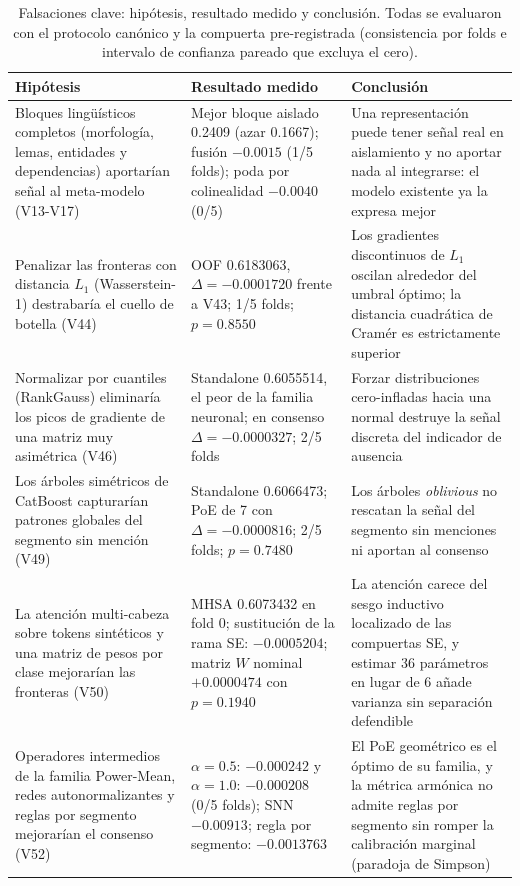 \documentclass[journal]{IEEEtai}
\begin{document}
\begin{table}[htbp]
\centering
\caption{Falsaciones clave: hip\'otesis, resultado medido y conclusi\'on. Todas se evaluaron con el protocolo can\'onico y la compuerta pre-registrada (consistencia por folds e intervalo de confianza pareado que excluya el cero).}
\label{tab:falsaciones}
\begin{tabular}{p{}p{}p{}}
\toprule
Hip\'otesis & Resultado medido & Conclusi\'on \\
\midrule
Bloques ling\"u\'isticos completos (morfolog\'ia, lemas, entidades y dependencias) aportar\'ian se\~nal al meta-modelo (V13-V17) & Mejor bloque aislado 0.2409 (azar 0.1667); fusi\'on $-0.0015$ (1/5 folds); poda por colinealidad $-0.0040$ (0/5) & Una representaci\'on puede tener se\~nal real en aislamiento y no aportar nada al integrarse: el modelo existente ya la expresa mejor \\
Penalizar las fronteras con distancia $L_1$ (Wasserstein-1) destrabar\'ia el cuello de botella (V44) & OOF 0.6183063, $\Delta = -0.0001720$ frente a V43; 1/5 folds; $p = 0.8550$ & Los gradientes discontinuos de $L_1$ oscilan alrededor del umbral \'optimo; la distancia cuadr\'atica de Cram\'er es estrictamente superior \\
Normalizar por cuantiles (RankGauss) eliminar\'ia los picos de gradiente de una matriz muy asim\'etrica (V46) & Standalone 0.6055514, el peor de la familia neuronal; en consenso $\Delta = -0.0000327$; 2/5 folds & Forzar distribuciones cero-infladas hacia una normal destruye la se\~nal discreta del indicador de ausencia \\
Los \'arboles sim\'etricos de CatBoost capturar\'ian patrones globales del segmento sin menci\'on (V49) & Standalone 0.6066473; PoE de 7 con $\Delta = -0.0000816$; 2/5 folds; $p = 0.7480$ & Los \'arboles \textit{oblivious} no rescatan la se\~nal del segmento sin menciones ni aportan al consenso \\
La atenci\'on multi-cabeza sobre tokens sint\'eticos y una matriz de pesos por clase mejorar\'ian las fronteras (V50) & MHSA 0.6073432 en fold 0; sustituci\'on de la rama SE: $-0.0005204$; matriz $W$ nominal $+0.0000474$ con $p = 0.1940$ & La atenci\'on carece del sesgo inductivo localizado de las compuertas SE, y estimar 36 par\'ametros en lugar de 6 a\~nade varianza sin separaci\'on defendible \\
Operadores intermedios de la familia Power-Mean, redes autonormalizantes y reglas por segmento mejorar\'ian el consenso (V52) & $\alpha = 0.5$: $-0.000242$ y $\alpha = 1.0$: $-0.000208$ (0/5 folds); SNN $-0.00913$; regla por segmento: $-0.0013763$ & El PoE geom\'etrico es el \'optimo de su familia, y la m\'etrica arm\'onica no admite reglas por segmento sin romper la calibraci\'on marginal (paradoja de Simpson) \\
\bottomrule
\end{tabular}
\end{table}
\end{document}
